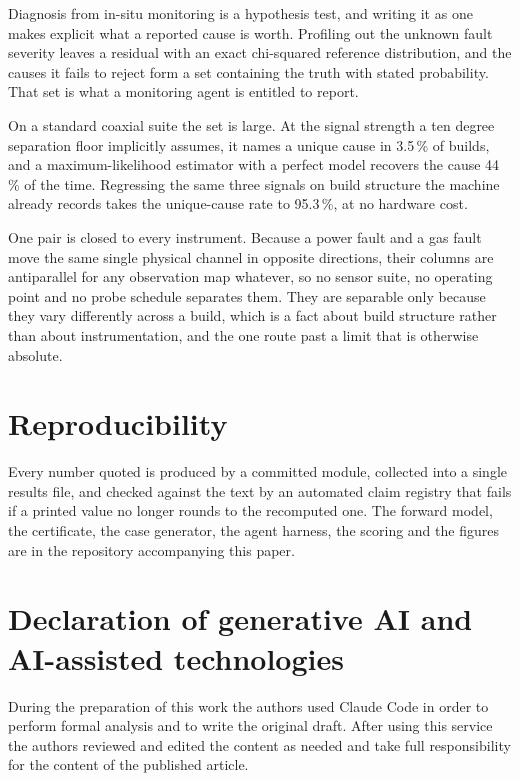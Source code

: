 \documentclass[preprint,12pt]{elsarticle}
\begin{document}
Diagnosis from in-situ monitoring is a hypothesis test, and writing it as one
makes explicit what a reported cause is worth. Profiling out the unknown fault
severity leaves a residual with an exact chi-squared reference distribution, and
the causes it fails to reject form a set containing the truth with stated
probability. That set is what a monitoring agent is entitled to report.

On a standard coaxial suite the set is large. At the signal strength a ten
degree separation floor implicitly assumes, it names a unique cause in 3.5\,\%
of builds, and a maximum-likelihood estimator with a perfect model recovers the
cause 44\,\% of the time. Regressing the same three signals on build structure
the machine already records takes the unique-cause rate to 95.3\,\%, at no
hardware cost.

One pair is closed to every instrument. Because a power fault and a gas fault
move the same single physical channel in opposite directions, their columns are
antiparallel for any observation map whatever, so no sensor suite, no operating
point and no probe schedule separates them. They are separable only because they
vary differently across a build, which is a fact about build structure rather
than about instrumentation, and the one route past a limit that is otherwise
absolute.

\section*{Reproducibility}

Every number quoted is produced by a committed module, collected into a single
results file, and checked against the text by an automated claim registry that
fails if a printed value no longer rounds to the recomputed one. The forward
model, the certificate, the case generator, the agent harness, the scoring and
the figures are in the repository accompanying this paper.

\section*{Declaration of generative AI and AI-assisted technologies}

During the preparation of this work the authors used Claude Code in order to
perform formal analysis and to write the original draft. After using this
service the authors reviewed and edited the content as needed and take full
responsibility for the content of the published article.
\end{document}
